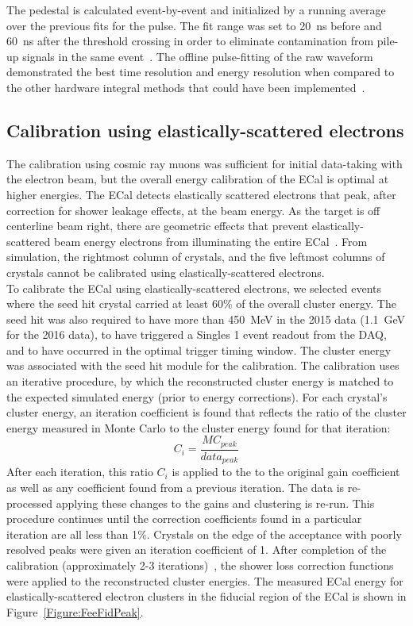 The pedestal is calculated event-by-event and initialized by a running average over the previous fits for the pulse. The fit range was set to 20~ns before and 60~ns after the threshold crossing in order to eliminate contamination from pile-up signals in the same event~\cite{baltzell_ecal_2015}. The offline pulse-fitting of the raw waveform demonstrated the best time resolution and energy resolution when compared to the other hardware integral methods that could have been implemented~\cite{baltzell_ecal_2015}.

\subsection{Calibration using elastically-scattered electrons}
The calibration using cosmic ray muons was sufficient for initial data-taking with the electron beam, but the overall energy calibration of the ECal is optimal at higher energies. The ECal detects elastically scattered electrons that peak, after correction for shower leakage effects, at the beam energy. As the target is off centerline beam right, there are geometric effects that prevent elastically-scattered beam energy electrons from illuminating the entire ECal~\cite{szumila-vance_hps_2016}. From simulation, the rightmost column of crystals, and the five leftmost columns of crystals cannot be calibrated using elastically-scattered electrons. \\
\indent To calibrate the ECal using elastically-scattered electrons, we selected events where the seed hit crystal carried at least 60$\%$ of the overall cluster energy. The seed hit was also required to have more than 450~MeV in the 2015 data (1.1~GeV for the 2016 data), to have triggered a Singles 1 event readout from the DAQ, and to have occurred in the optimal trigger timing window. The cluster energy was associated with the seed hit module for the calibration. The calibration uses an iterative procedure, by which the reconstructed cluster energy is matched to the expected simulated energy (prior to energy corrections). For each crystal's cluster energy, an iteration coefficient is found that reflects the ratio of the cluster energy measured in Monte Carlo to the cluster energy found for that iteration:\\
\begin{equation}
	\label{eq:feeiter}
	C_i = \dfrac{MC_{peak}}{data_{peak}}
\end{equation}
After each iteration, this ratio $C_i$ is applied to the to the original gain coefficient as well as any coefficient found from a previous iteration. The data is re-processed applying these changes to the gains and clustering is re-run. This procedure continues until the correction coefficients found in a particular iteration are all less than 1$\%$. Crystals on the edge of the acceptance with poorly resolved peaks were given an iteration coefficient of 1. After completion of the calibration (approximately 2-3 iterations)~\cite{szumila-vance_hps_2016}, the shower loss correction functions were applied to the reconstructed cluster energies. The measured ECal energy for elastically-scattered electron clusters in the fiducial region of the ECal is shown in Figure~\ref{Figure:FeeFidPeak}.
